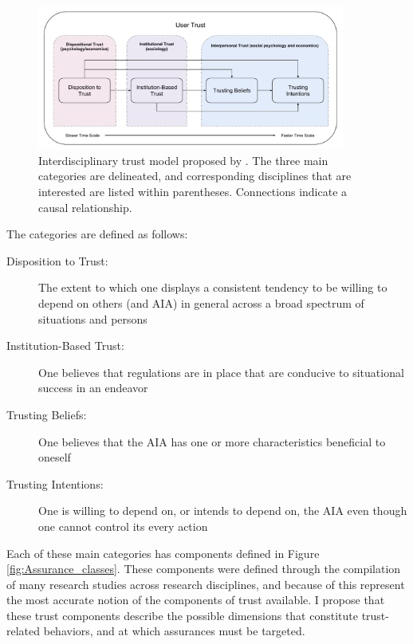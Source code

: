         \begin{figure}[htbp]
            \centering
            \includegraphics[width=0.9\textwidth]{Figures/UserTrust}
            \caption{Interdisciplinary trust model proposed by \citet{McKnight2001-fa}. The three main categories are delineated, and corresponding disciplines that are interested are listed within parentheses. Connections indicate a causal relationship.}
            \label{fig:UserTrust}
        \end{figure}

        The categories are defined as follows:

        \begin{description}
            \item [Disposition to Trust:] The extent to which one displays a consistent tendency to be willing to depend on others (and AIA) in general across a broad spectrum of situations and persons
            \item [Institution-Based Trust:] One believes that regulations are in place that are conducive to situational success in an endeavor
            \item [Trusting Beliefs:] One believes that the AIA has one or more characteristics beneficial to oneself
            \item [Trusting Intentions:] One is willing to depend on, or intends to depend on, the AIA even though one cannot control its every action
        \end{description}

        Each of these main categories has components defined in Figure \ref{fig:Assurance_classes}. These components were defined through the compilation of many research studies across research disciplines, and because of this represent the most accurate notion of the components of trust available. I propose that these trust components describe the possible dimensions that constitute trust-related behaviors, and at which assurances must be targeted.

